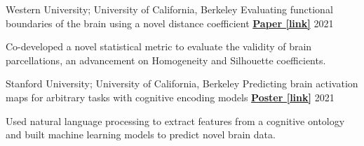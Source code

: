 \begin{cventries}
  \cventry
  	{Western University; University of California, Berkeley}
    {Evaluating functional boundaries of the brain using a novel distance coefficient} %
    {\href{https://www.biorxiv.org/content/10.1101/2021.05.11.443151v1.full.pdf}{\textbf{Paper [link]}}}
    {2021} %
    {
      \begin{cvitems} %
        \item {Co-developed a novel statistical metric to evaluate the validity of brain parcellations, an advancement on Homogeneity and Silhouette coefficients.} 	     		
      \end{cvitems}
    }
    
  \cventry
    {Stanford University; University of California, Berkeley}
    {Predicting brain activation maps for arbitrary tasks with cognitive encoding models} %
    {\href{https://drive.google.com/file/d/1dRNSsRzGSSF9QJLJv_jK1R7BmmWfOsMt/view}{\textbf{Poster [link]}}}
    {2021} %
    {
      \begin{cvitems} %
      	\item {Used natural language processing to extract features from a cognitive ontology and built machine learning models to predict novel brain data.}
      \end{cvitems}
    }   
    
    

\end{cventries}
